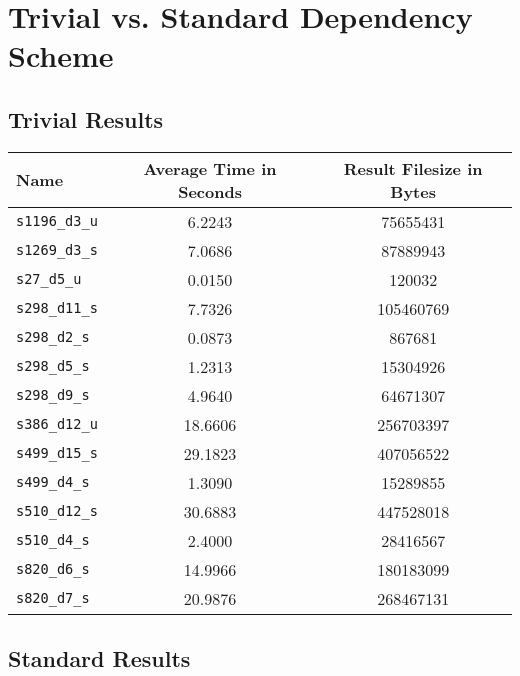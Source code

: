 \chapter{Trivial vs. Standard Dependency Scheme} \label{trivialvsstandardappendix}

\section{Trivial Results}

\begin{center}
\begin{tabular}{| l | S[table-format=3.2] | S[table-format=3.2] |}
\hline
\textbf{Name} & \textbf{Average Time in Seconds} & \textbf{Result Filesize in Bytes} \\ \hline
\texttt{s1196\_d3\_u} & 6.2243 & 75655431 \\
\texttt{s1269\_d3\_s} & 7.0686 & 87889943 \\
\texttt{s27\_d5\_u} & 0.0150 & 120032 \\
\texttt{s298\_d11\_s} & 7.7326 & 105460769 \\
\texttt{s298\_d2\_s} & 0.0873 & 867681 \\
\texttt{s298\_d5\_s} & 1.2313 & 15304926 \\
\texttt{s298\_d9\_s} & 4.9640 & 64671307 \\
\texttt{s386\_d12\_u} & 18.6606 & 256703397 \\
\texttt{s499\_d15\_s} & 29.1823 & 407056522 \\
\texttt{s499\_d4\_s} & 1.3090 & 15289855 \\
\texttt{s510\_d12\_s} & 30.6883 & 447528018 \\
\texttt{s510\_d4\_s} & 2.4000 & 28416567 \\
\texttt{s820\_d6\_s} & 14.9966 & 180183099 \\
\texttt{s820\_d7\_s} & 20.9876 & 268467131 \\
\hline
\end{tabular}
\end{center}

\section{Standard Results}

